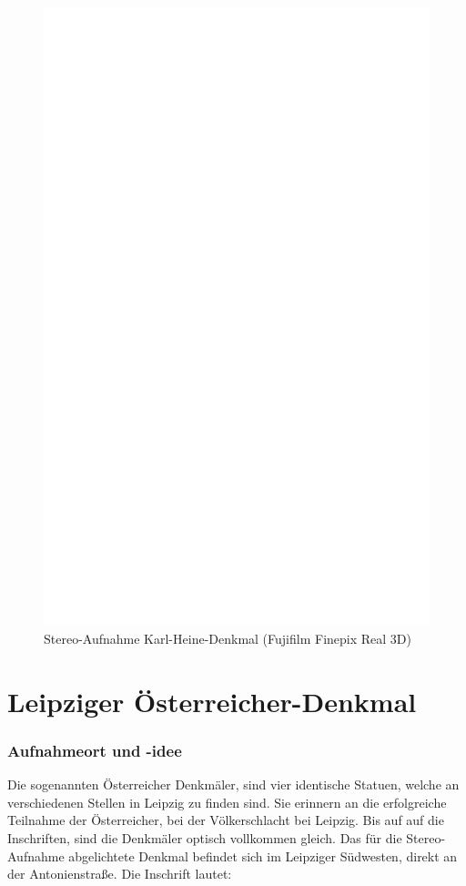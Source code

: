 \documentclass[liststotoc,bibtotoc,fontsize=14pt,]{scrreprt}
\begin{document}
\newpage
\begin{figure}[h]
	\includegraphics[width=\linewidth]{img/ph.jpg}
	\caption{Stereo-Aufnahme Karl-Heine-Denkmal (Fujifilm Finepix Real 3D)}
\end{figure}

\section{Leipziger Österreicher-Denkmal}
\label{sec:nikolai}
\subsubsection{Aufnahmeort und -idee}
Die sogenannten Österreicher Denkmäler, sind vier identische Statuen, welche an verschiedenen Stellen in Leipzig zu finden sind. Sie erinnern an die erfolgreiche Teilnahme der Österreicher, bei der Völkerschlacht bei Leipzig. Bis auf auf die Inschriften, sind die Denkmäler optisch vollkommen gleich. Das für die Stereo-Aufnahme abgelichtete Denkmal befindet sich im Leipziger Südwesten, direkt an der Antonienstraße. Die Inschrift lautet:
\end{document}
